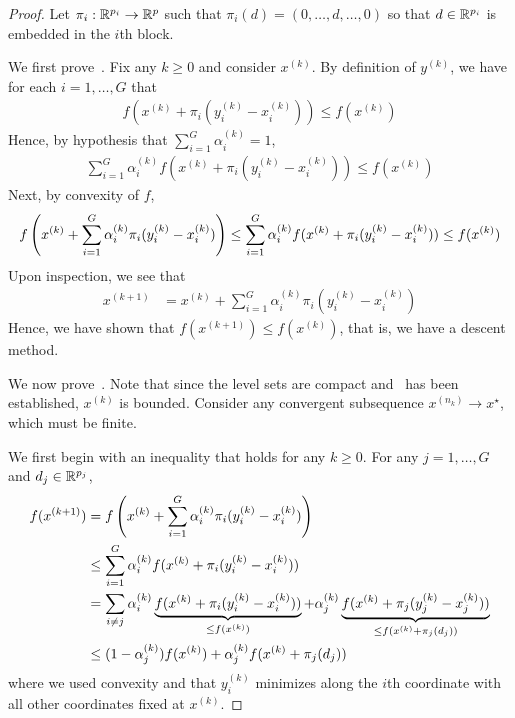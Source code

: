 \begin{proof}

Let $\pi_i: \mathbb{R}^{p_i} \to \mathbb{R}^p$ such that $\pi_i(d) = (0,\ldots, d,\ldots, 0)$
so that $d \in \mathbb{R}^{p_i}$ is embedded in the $i$th block.

We first prove~.
Fix any $k\geq 0$ and consider $x^{(k)}$.
By definition of $y^{(k)}$, we have for each $i=1,\ldots, G$ that
\begin{align*}
    f(x^{(k)} + \pi_i(y_i^{(k)} - x_i^{(k)}))
    \leq
    f(x^{(k)})
\end{align*}
Hence, by hypothesis that $\sum\limits_{i=1}^G \alpha_i^{(k)} = 1$,
\begin{align*}
    \sum\limits_{i=1}^G 
    \alpha_i^{(k)}
    f(x^{(k)} + \pi_i(y_i^{(k)} - x_i^{(k)}))
    \leq
    f(x^{(k)})
\end{align*}
Next, by convexity of $f$, 
\begin{align*}
    f\left(
        x^{(k)}
        +
        \sum\limits_{i=1}^G
        \alpha_i^{(k)}
        \pi_i(y_i^{(k)} - x_i^{(k)})
    \right)
    \leq
    \sum\limits_{i=1}^G 
    \alpha_i^{(k)}
    f(x^{(k)} + \pi_i(y_i^{(k)} - x_i^{(k)}))
    \leq
    f(x^{(k)})
\end{align*}
Upon inspection, we see that
\begin{align*}
    x^{(k+1)}
    &=
    x^{(k)}
    +
    \sum\limits_{i=1}^G
    \alpha_i^{(k)}
    \pi_i(y_i^{(k)} - x_i^{(k)})
\end{align*}
Hence, we have shown that $f(x^{(k+1)}) \leq f(x^{(k)})$,
that is, we have a descent method.

We now prove~.
Note that since the level sets are compact 
and~ has been established, $x^{(k)}$ is bounded.
Consider any convergent subsequence $x^{(n_k)} \to x^\star$, which must be finite.

We first begin with an inequality that holds for any $k \geq 0$.
For any $j=1,\ldots, G$ and $d_j \in \mathbb{R}^{p_j}$,
\begin{align}
    f(x^{(k+1)})
    &=
    f\left(x^{(k)} + \sum\limits_{i=1}^G \alpha_i^{(k)} \pi_i(y_i^{(k)}-x_i^{(k)})\right)
    \nonumber
    \\&\leq
    \sum\limits_{i=1}^G
    \alpha_i^{(k)}
    f(x^{(k)} + \pi_i(y_i^{(k)}-x_i^{(k)}))
    \nonumber
    \\&=
    \sum\limits_{i\neq j}
    \alpha_i^{(k)}
    \underbrace{f(x^{(k)} + \pi_i(y_i^{(k)}-x_i^{(k)}))}_{\leq f(x^{(k)})}
    +
    \alpha_j^{(k)}
    \underbrace{f(x^{(k)} + \pi_j(y_j^{(k)}-x_j^{(k)}))}_{\leq f(x^{(k)} + \pi_j(d_j))}
    \nonumber
    \\&\leq
    (1-\alpha_j^{(k)}) f(x^{(k)})
    + 
    \alpha_j^{(k)}
    f(x^{(k)} + \pi_j(d_j))
    \label{eq:thm:parallel-bcd:key-inequality}
\end{align}
where we used convexity and that $y_i^{(k)}$ minimizes along the $i$th coordinate
with all other coordinates fixed at $x^{(k)}$.


\end{proof}
